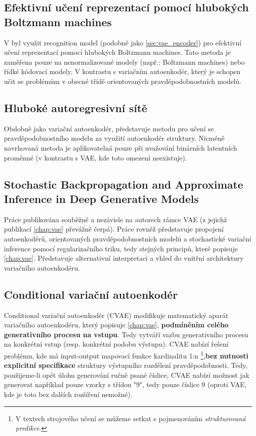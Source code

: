 \subsection{Efektivní učení reprezentací pomocí hlubokých Boltzmann machines}
V \cite{Salakhutdinov2010} byl využit recognition model (podobně jako \autoref{sec:vae_encoder}) pro efektivní učení reprezentací pomocí hlubokých Boltzmann machines. 
Tato metoda je zaměřena pouze na nenormalizované modely (např.: Boltzmann machines) nebo řídké kódovací modely. V kontrastu s variačním autoenkodér, který je schopen učit se problémům v obecné třídě orientovaných pravděpodobnostních modelů. \cite{Kingma2019}

\subsection{Hluboké autoregresivní sítě}
Obdobně jako variační autoenkodér, \cite{Gregor2014} představuje metodu pro učení se pravděpodobnostního modelu za využití autoenkodér struktury. Nicméně navrhovaná metoda je aplikovatelná pouze při uvažování binárních latentních proměnné (v kontrastu s VAE, kde toto omezení neexistuje). \cite{Kingma2019}

\subsection{Stochastic Backpropagation and Approximate Inference in Deep Generative Models}
Práce publikována souběžně a nezávisle na autorech rámce VAE (z jejichž publikací \autoref{chap:vae} převážně čerpá). Práce \cite{Rezende2014} rovněž představuje propojení autoenkodérů, orientovaných pravděpodobnostních modelů a stochastické variační inference pomocí regularizačního triku, tedy stejných principů, které popisuje \autoref{chap:vae}.
Představuje alternativní interpretaci a vhled do vnitřní architektury variačního autoenkodéru.

\subsection{Conditional variační autoenkodér}
Conditional variační autoenkodér (CVAE) \cite{Sohn2015} modifikuje matematický aparát variačního autoenkodéru, který popisuje \autoref{chap:vae}, \textbf{podmíněním celého generativního procesu na vstupu}. Tedy vytváří vazbu generativního procesu na konkrétní vstup (resp. konkrétní podobu výstupu).
CVAE nabízí řešení problému, kde má input-output mapovací funkce kardinalitu 1:n
\footnote{V textech strojového učení se můžeme setkat s pojmenováním \emph{strukturovaná predikce}.},\textbf{bez nutnosti explicitní specifikace} struktury výstupního rozdělení pravděpodobnosti.
Tedy, použijeme-li opět úlohu generování ručně psané číslice, CVAE nabízí možnost jak generovat například pouze vzorky s třídou "9", tedy pouze číslice 9 (oproti VAE, kde je toto bez dalších rozšíření nemožné). \cite{Doersch2021}